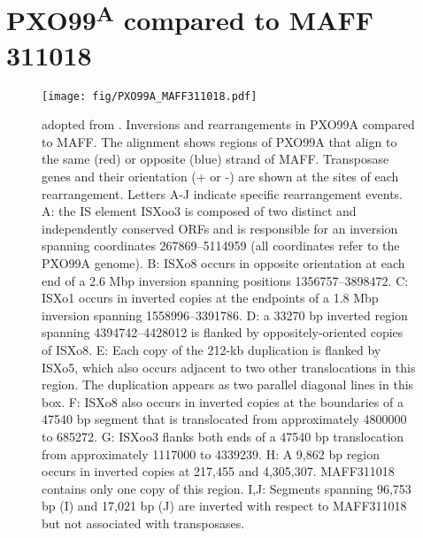 \documentclass[a4paper,9pt]{extarticle}
\begin{document}
\clearpage
\section{PXO99\textsuperscript{A} compared to MAFF 311018}
\begin{figure}[!h]
  \centering
  \texttt{[image: fig/PXO99A\_MAFF311018.pdf]}
  \caption{adopted from \cite{salzberg2008genome}.
    Inversions and rearrangements in PXO99A compared to MAFF. The alignment shows regions of PXO99A that align to the same (red) or opposite (blue) strand of MAFF. Transposase genes and their orientation (+ or -) are shown at the sites of each rearrangement. Letters A-J indicate specific rearrangement events. A: the IS element ISXoo3 is composed of two distinct and independently conserved ORFs and is responsible for an inversion spanning coordinates 267869–5114959 (all coordinates refer to the PXO99A genome). B: ISXo8 occurs in opposite orientation at each end of a 2.6 Mbp inversion spanning positions 1356757–3898472. C: ISXo1 occurs in inverted copies at the endpoints of a 1.8 Mbp inversion spanning 1558996–3391786. D: a 33270 bp inverted region spanning 4394742–4428012 is flanked by oppositely-oriented copies of ISXo8. E: Each copy of the 212-kb duplication is flanked by ISXo5, which also occurs adjacent to two other translocations in this region. The duplication appears as two parallel diagonal lines in this box. F: ISXo8 also occurs in inverted copies at the boundaries of a 47540 bp segment that is translocated from approximately 4800000 to 685272. G: ISXoo3 flanks both ends of a 47540 bp translocation from approximately 1117000 to 4339239. H: A 9,862 bp region occurs in inverted copies at 217,455 and 4,305,307. MAFF311018 contains only one copy of this region. I,J: Segments spanning 96,753 bp (I) and 17,021 bp (J) are inverted with respect to MAFF311018 but not associated with transposases.}
\end{figure}

\end{document}
